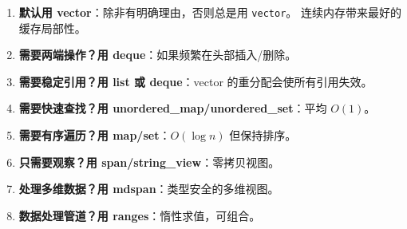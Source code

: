 \documentclass[12pt,a4paper,fontset=fandol]{ctexbook}
\begin{document}
\vspace{1cm}

\begin{bestpractice}[title=容器选择黄金法则]
\begin{enumerate}
\item \textbf{默认用 vector}：除非有明确理由，否则总是用 \texttt{vector}。
    连续内存带来最好的缓存局部性。
\item \textbf{需要两端操作？用 deque}：如果频繁在头部插入/删除。
\item \textbf{需要稳定引用？用 list 或 deque}：vector 的重分配会使所有引用失效。
\item \textbf{需要快速查找？用 unordered\_map/unordered\_set}：平均 $O(1)$。
\item \textbf{需要有序遍历？用 map/set}：$O(\log n)$ 但保持排序。
\item \textbf{只需要观察？用 span/string\_view}：零拷贝视图。
\item \textbf{处理多维数据？用 mdspan}：类型安全的多维视图。
\item \textbf{数据处理管道？用 ranges}：惰性求值，可组合。
\end{enumerate}
\end{bestpractice}
\end{document}
